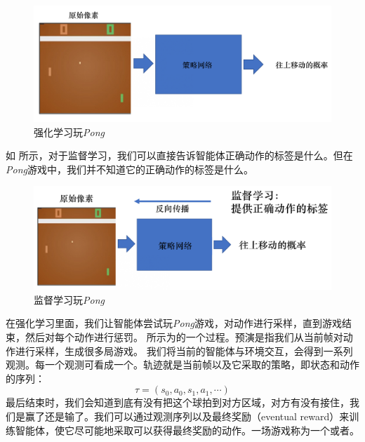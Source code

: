 \begin{figure}[htb]
    \centering
    \includegraphics[width=0.7\linewidth]{res/ch1/1.10}
    \caption{强化学习玩\textit{Pong}}
    \label{fig:fig1.10}
\end{figure}

如 所示，对于监督学习，我们可以直接告诉智能体正确动作的标签是什么。但在\textit{Pong}游戏中，我们并不知道它的正确动作的标签是什么。

\begin{figure}[htb]
    \centering
    \includegraphics[width=0.7\linewidth]{res/ch1/1.11}
    \caption{监督学习玩\textit{Pong}}
    \label{fig:fig1.11}
\end{figure}

在强化学习里面，我们让智能体尝试玩\textit{Pong}游戏，对动作进行采样，直到游戏结束，然后对每个动作进行惩罚。
 所示为的一个过程。预演是指我们从当前帧对动作进行采样，生成很多局游戏。
我们将当前的智能体与环境交互，会得到一系列观测。每一个观测可看成一个。轨迹就是当前帧以及它采取的策略，即状态和动作的序列：
\begin{equation}
    \label{eq:}
    \tau=\left(s_{0}, a_{0}, s_{1}, a_{1}, \cdots\right)
\end{equation}
最后结束时，我们会知道到底有没有把这个球拍到对方区域，对方有没有接住，我们是赢了还是输了。我们可以通过观测序列以及最终奖励（eventual reward）来训练智能体，使它尽可能地采取可以获得最终奖励的动作。一场游戏称为一个或者。

